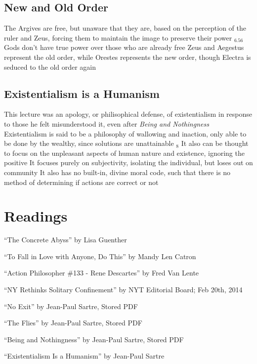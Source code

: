 \documentclass[11 pt, twoside]{article}
\newenvironment{outline*}
{
	\begin{outline}[enumerate]
	}
	{\end{outline}
}
\newcommand{\foota}[1]{\hyperlink{#1}{$_#1$}}
\newcommand{\footb}[2]{\hyperlink{#1}{$_{#1.#2}$}}
\begin{document}
\subsection{New and Old Order}
\begin{outline*}
\1 The Argives are free, but unaware that they are, based on the perception of the ruler and Zeus, forcing them to maintain the image to preserve their power \footb{6}{56}
\2 Gods don't have true power over those who are already free
\2 Zeus and Aegestus represent the old order, while Orestes represents the new order, though Electra is seduced to the old order again
\1 %
\end{outline*}
\subsection{Existentialism is a Humanism}
\begin{outline*}
\1 This lecture was an apology, or philisophical defense, of existentialism in response to those he felt misunderstood it, even after \textit{Being and Nothingness}
\1 Existentialism is said to be a philosophy of wallowing and inaction, only able to be done by the wealthy, since solutions are unattainable \foota{8}
\2 It also can be thought to focus on the unpleasant aspects of human nature and existence, ignoring the positive
\2 It focuses purely on subjectivity, isolating the individual, but loses out on community
\2 It also has no built-in, divine moral code, such that there is no method of determining if actions are correct or not 
\end{outline*}

\section{Readings}
\begin{enumerate}
\hypertarget{1}{\item ``The Concrete Abyss'' by Lisa Guenther}
\hypertarget{2}{\item ``To Fall in Love with Anyone, Do This'' by Mandy Len Catron}
\hypertarget{3}{\item ``Action Philosopher \#133 - Rene Descartes'' by Fred Van Lente}
\hypertarget{4}{\item ``NY Rethinks Solitary Confinement'' by NYT Editorial Board; Feb 20th, 2014}
\hypertarget{5}{\item ``No Exit'' by Jean-Paul Sartre, Stored PDF}
\hypertarget{6}{\item ``The Flies'' by Jean-Paul Sartre, Stored PDF}
\hypertarget{7}{\item ``Being and Nothingness'' by Jean-Paul Sartre, Stored PDF}
\hypertarget{8}{\item ``Existentialism Is a Humanism'' by Jean-Paul Sartre}
\end{enumerate}
\end{document}
